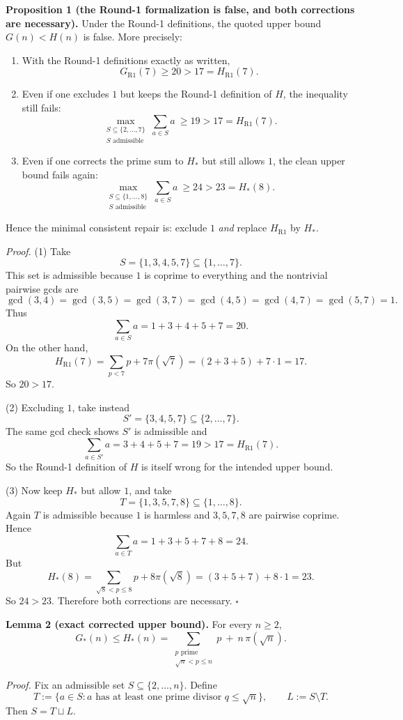 \noindent\textbf{Proposition 1 (the Round-1 formalization is false, and both corrections are necessary).}
Under the Round-1 definitions, the quoted upper bound $G(n)<H(n)$ is false.
More precisely:
\begin{enumerate}
\item With the Round-1 definitions exactly as written,
\[
G_{\mathrm{R1}}(7)\ge 20>17=H_{\mathrm{R1}}(7).
\]
\item Even if one excludes $1$ but keeps the Round-1 definition of $H$, the inequality still fails:
\[
\max_{\substack{S\subseteq\{2,\dots,7\}\\ S\text{ admissible}}}\sum_{a\in S}a\ \ge 19>17=H_{\mathrm{R1}}(7).
\]
\item Even if one corrects the prime sum to $H_*$ but still allows $1$, the clean upper bound fails again:
\[
\max_{\substack{S\subseteq\{1,\dots,8\}\\ S\text{ admissible}}}\sum_{a\in S}a\ \ge 24>23=H_*(8).
\]
\end{enumerate}
Hence the minimal consistent repair is: exclude $1$ \emph{and} replace $H_{\mathrm{R1}}$ by $H_*$.

\noindent\emph{Proof.}
(1) Take
\[
S=\{1,3,4,5,7\}\subseteq\{1,\dots,7\}.
\]
This set is admissible because $1$ is coprime to everything and the nontrivial pairwise gcds are
\[
\gcd(3,4)=\gcd(3,5)=\gcd(3,7)=\gcd(4,5)=\gcd(4,7)=\gcd(5,7)=1.
\]
Thus
\[
\sum_{a\in S}a=1+3+4+5+7=20.
\]
On the other hand,
\[
H_{\mathrm{R1}}(7)=\sum_{p<7}p+7\pi(\sqrt7)=(2+3+5)+7\cdot 1=17.
\]
So $20>17$.

(2) Excluding $1$, take instead
\[
S'=\{3,4,5,7\}\subseteq\{2,\dots,7\}.
\]
The same gcd check shows $S'$ is admissible and
\[
\sum_{a\in S'}a=3+4+5+7=19>17=H_{\mathrm{R1}}(7).
\]
So the Round-1 definition of $H$ is itself wrong for the intended upper bound.

(3) Now keep $H_*$ but allow $1$, and take
\[
T=\{1,3,5,7,8\}\subseteq\{1,\dots,8\}.
\]
Again $T$ is admissible because $1$ is harmless and $3,5,7,8$ are pairwise coprime. Hence
\[
\sum_{a\in T}a=1+3+5+7+8=24.
\]
But
\[
H_*(8)=\sum_{\sqrt8<p\le 8}p+8\pi(\sqrt8)=(3+5+7)+8\cdot 1=23.
\]
So $24>23$.
Therefore both corrections are necessary.
\hfill$\square$

\medskip
\noindent\textbf{Lemma 2 (exact corrected upper bound).}
For every $n\ge 2$,
\[
G_*(n)\le H_*(n)=\sum_{\substack{p\text{ prime}\\ \sqrt n<p\le n}}p\ +\ n\,\pi(\sqrt n).
\]

\noindent\emph{Proof.}
Fix an admissible set $S\subseteq\{2,\dots,n\}$.
Define
\[
T:=\{a\in S:\text{$a$ has at least one prime divisor }q\le \sqrt n\},
\qquad
L:=S\setminus T.
\]
Then $S=T\sqcup L$.

